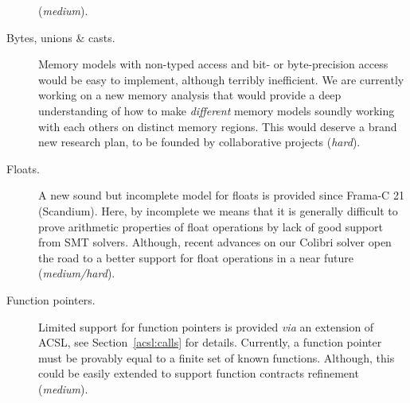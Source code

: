 \begin{description}
(\textit{medium}).
\item[Bytes, unions \& casts.]
Memory models with non-typed access and bit- or byte-precision access would
be easy to implement, although terribly inefficient. We are currently working on a new memory analysis that would provide a deep understanding of how to make \emph{different} memory models soundly working with each others on distinct memory regions. This would deserve a brand new research plan, to be founded by collaborative projects (\textit{hard}).
\item[Floats.]
A new sound but incomplete model for floats is provided since \textsf{Frama-C 21} (Scandium). Here, by incomplete we means that it is generally difficult
to prove arithmetic properties of float operations by lack of good support from \textsf{SMT} solvers. Although, recent advances on our \textsf{Colibri} solver open the road to a better support for float operations in a near future (\textit{medium/hard}).
\item[Function pointers.]
Limited support for function pointers is provided \emph{via} an extension of \textsf{ACSL}, see Section~\ref{acsl:calls} for details. Currently, a function
pointer must be provably equal to a finite set of known functions. Although,
this could be easily extended to support function contracts refinement (\textit{medium}).
\end{description}
